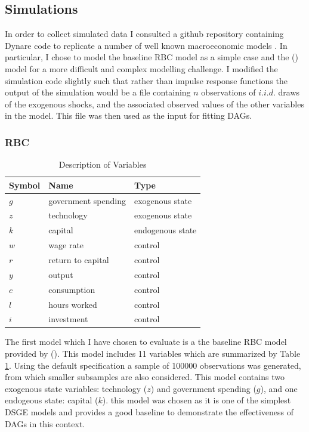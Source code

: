 \documentclass{article}
\begin{document}
\subsection{Simulations}

In order to collect simulated data I consulted a github repository containing Dynare code to replicate a number of well known macroeconomic models \parencite{pfeifer2020}. In particular, I chose to model the baseline RBC model as a simple case and the \citeauthor{smets2007shocks} (\citeyear{smets2007shocks}) model for a more difficult and complex modelling challenge. I modified the simulation code slightly such that rather than impulse response functions the output of the simulation would be a file containing $n$ observations of $i.i.d.$ draws of the exogenous shocks, and the associated observed values of the other variables in the model. This file was then used as the input for fitting DAGs.

\subsubsection{RBC}

\begin{table}
  \centering
  \begin{tabular}{|l|l|l|}
    \hline
    Symbol & Name & Type \\
    \hline
    $g$ & government spending & exogenous state \\
    $z$ & technology & exogenous state \\
    $k$ & capital & endogenous state \\
    $w$ & wage rate & control \\
    $r$ & return to capital & control \\
    $y$ & output & control \\
    $c$ & consumption & control \\
    $l$ & hours worked & control \\
    $i$ & investment & control \\ \cline{2-2}
    \hline
  \end{tabular}
  \caption{Description of Variables}
  \label{tab1}
\end{table}

The first model which I have chosen to evaluate is a the baseline RBC model provided by \citeauthor{pfeifer2020} (\citeyear{pfeifer2020}). This model includes 11 variables which are summarized by Table \ref{tab1}. Using the default specification a sample of 100000 observations was generated, from which smaller subsamples are also considered. This model contains two exogenous state variables: technology ($z$) and government spending ($g$), and one endogeous state: capital ($k$). this model was chosen as it is one of the simplest DSGE models and provides a good baseline to demonstrate the effectiveness of DAGs in this context.
\end{document}
